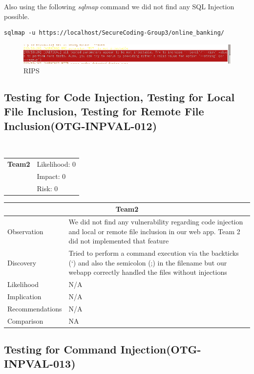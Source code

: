 \documentclass[headsepline,footsepline,footinclude=false,oneside,fontsize=11pt,paper=a4,listof=totoc,bibliography=totoc]{scrbook} %
\begin{document}
Also using the following \textit{sqlmap} command we did not find any SQL Injection possible.\\

\begin{lstlisting}
sqlmap -u https://localhost/SecureCoding-Group3/online_banking/
\end{lstlisting}
\begin{figure}[ht!]
	\centering
	\includegraphics[width=150mm]{logos/sql.jpg}
	\caption{RIPS \label{overflow}}
\end{figure}



 
\pagebreak
\subsection{Testing for Code Injection, Testing for Local File Inclusion, Testing for Remote File Inclusion(OTG-INPVAL-012)}\

\begin{tabular}{cR{12cm}}
	\textbf{Team2} & Likelihood: 0\\& Impact: 0\\& Risk: 0
\end{tabular}

\begin{tabular}{ l|p{11cm}  }
	\hline
	\multicolumn{2}{c}{\textbf{Team2}} \\
	\hline
	Observation   & We did not find any vulnerability regarding code injection and local or remote file inclusion in our web app. Team 2 did not implemented that feature\\
	Discovery  & Tried to perform a command execution via the backticks (`) and also the semicolon (;) in the filename but our	webapp correctly handled the files without injections \\
	Likelihood & N/A \\
	Implication    & N/A \\
	Recommendations & N/A \\
	Comparison& NA \\
	\hline
\end{tabular}

\pagebreak
\subsection{Testing for Command Injection(OTG-INPVAL-013)}\
\end{document}
